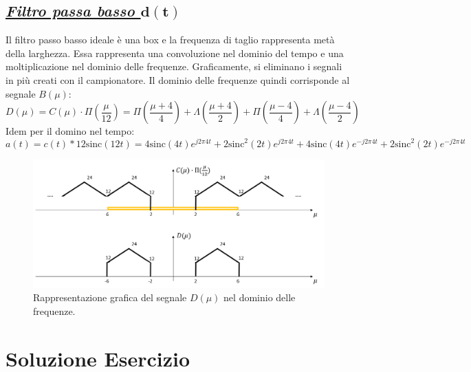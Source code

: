 \documentclass[a4paper]{article}
\begin{document}
	\subsection*{\textcolor{Green4}{\textbf{\emph{\underline{Filtro passa basso $\boldsymbol{d\left(t\right)}$}}}}}
	
	Il filtro passo basso ideale è una box e la frequenza di taglio rappresenta metà della larghezza. Essa rappresenta una convoluzione nel dominio del tempo e una moltiplicazione nel dominio delle frequenze. Graficamente, si eliminano i segnali in più creati con il campionatore. Il dominio delle frequenze quindi corrisponde al segnale $B\left(\mu\right)$:
	\begin{equation*}
			D\left(\mu\right) = C\left(\mu\right) \cdot \Pi\left(\dfrac{\mu}{12}\right) = \Pi\left(\dfrac{\mu + 4}{4}\right) + \Lambda\left(\dfrac{\mu + 4}{2}\right) + \Pi\left(\dfrac{\mu - 4}{4}\right) + \Lambda\left(\dfrac{\mu - 4}{2}\right)
	\end{equation*}
	Idem per il domino nel tempo:
	\begin{equation*}
		a\left(t\right) = c\left(t\right) * 12\mathrm{sinc}\left(12t\right) = 4\mathrm{sinc}\left(4t\right)e^{j 2 \pi 4 t} + 2\mathrm{sinc}^{2}\left(2t\right)e^{j 2 \pi 4 t} + 4\mathrm{sinc}\left(4t\right)e^{-j 2 \pi 4 t} + 2\mathrm{sinc}^{2}\left(2t\right)e^{-j 2 \pi 4 t}
	\end{equation*}
	\begin{figure}[!htp]
		\centering
		\includegraphics[width=\textwidth]{img/fig_4.png}
		\caption*{Rappresentazione grafica del segnale $D\left(\mu\right)$ nel dominio delle frequenze.}
	\end{figure}\newpage

	\section{Soluzione Esercizio}
	
\end{document}
